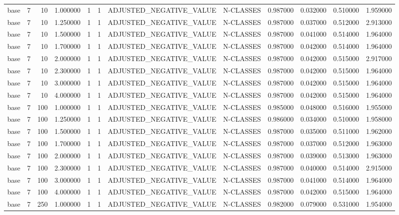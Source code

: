 \begin{tabular}{lrrrllllrrrr}
base & 7 & 10 & 1.000000 & 1 & 1 & ADJUSTED_NEGATIVE_VALUE & N-CLASSES & 0.987000 & 0.032000 & 0.510000 & 1.959000 \\
base & 7 & 10 & 1.250000 & 1 & 1 & ADJUSTED_NEGATIVE_VALUE & N-CLASSES & 0.987000 & 0.037000 & 0.512000 & 2.913000 \\
base & 7 & 10 & 1.500000 & 1 & 1 & ADJUSTED_NEGATIVE_VALUE & N-CLASSES & 0.987000 & 0.041000 & 0.514000 & 1.964000 \\
base & 7 & 10 & 1.700000 & 1 & 1 & ADJUSTED_NEGATIVE_VALUE & N-CLASSES & 0.987000 & 0.042000 & 0.514000 & 1.964000 \\
base & 7 & 10 & 2.000000 & 1 & 1 & ADJUSTED_NEGATIVE_VALUE & N-CLASSES & 0.987000 & 0.042000 & 0.515000 & 2.917000 \\
base & 7 & 10 & 2.300000 & 1 & 1 & ADJUSTED_NEGATIVE_VALUE & N-CLASSES & 0.987000 & 0.042000 & 0.515000 & 1.964000 \\
base & 7 & 10 & 3.000000 & 1 & 1 & ADJUSTED_NEGATIVE_VALUE & N-CLASSES & 0.987000 & 0.042000 & 0.515000 & 1.964000 \\
base & 7 & 10 & 4.000000 & 1 & 1 & ADJUSTED_NEGATIVE_VALUE & N-CLASSES & 0.987000 & 0.042000 & 0.515000 & 1.964000 \\
base & 7 & 100 & 1.000000 & 1 & 1 & ADJUSTED_NEGATIVE_VALUE & N-CLASSES & 0.985000 & 0.048000 & 0.516000 & 1.955000 \\
base & 7 & 100 & 1.250000 & 1 & 1 & ADJUSTED_NEGATIVE_VALUE & N-CLASSES & 0.986000 & 0.034000 & 0.510000 & 1.958000 \\
base & 7 & 100 & 1.500000 & 1 & 1 & ADJUSTED_NEGATIVE_VALUE & N-CLASSES & 0.987000 & 0.035000 & 0.511000 & 1.962000 \\
base & 7 & 100 & 1.700000 & 1 & 1 & ADJUSTED_NEGATIVE_VALUE & N-CLASSES & 0.987000 & 0.037000 & 0.512000 & 1.963000 \\
base & 7 & 100 & 2.000000 & 1 & 1 & ADJUSTED_NEGATIVE_VALUE & N-CLASSES & 0.987000 & 0.039000 & 0.513000 & 1.963000 \\
base & 7 & 100 & 2.300000 & 1 & 1 & ADJUSTED_NEGATIVE_VALUE & N-CLASSES & 0.987000 & 0.040000 & 0.514000 & 2.915000 \\
base & 7 & 100 & 3.000000 & 1 & 1 & ADJUSTED_NEGATIVE_VALUE & N-CLASSES & 0.987000 & 0.041000 & 0.514000 & 1.964000 \\
base & 7 & 100 & 4.000000 & 1 & 1 & ADJUSTED_NEGATIVE_VALUE & N-CLASSES & 0.987000 & 0.042000 & 0.515000 & 1.964000 \\
base & 7 & 250 & 1.000000 & 1 & 1 & ADJUSTED_NEGATIVE_VALUE & N-CLASSES & 0.982000 & 0.079000 & 0.531000 & 1.954000 \\

\end{tabular}
